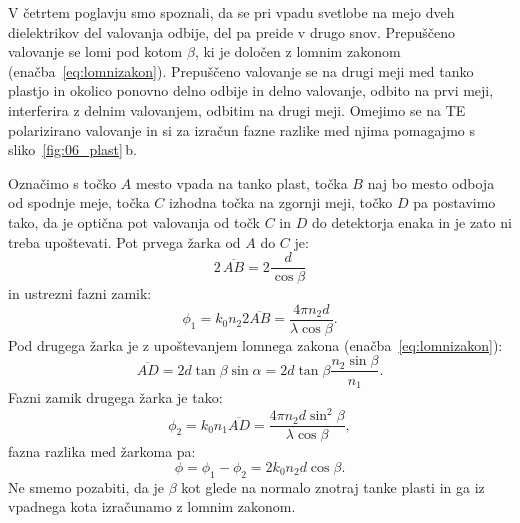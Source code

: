 V četrtem poglavju smo spoznali, da se pri vpadu svetlobe na mejo dveh dielektrikov
del valovanja odbije, del pa preide v drugo snov. Prepuščeno valovanje se lomi pod kotom
$\beta$, ki je določen z lomnim zakonom (enačba~\ref{eq:lomnizakon}). Prepuščeno valovanje
se na drugi meji med tanko plastjo in okolico ponovno delno odbije in delno valovanje, 
odbito na prvi meji, interferira z delnim valovanjem, odbitim na drugi meji. Omejimo
se na TE polarizirano valovanje in si za
izračun fazne razlike med njima pomagajmo s sliko~\ref{fig:06_plast}\,b.

Označimo s točko $A$ mesto vpada na tanko plast, točka $B$ naj bo mesto odboja 
od spodnje meje, točka $C$ izhodna točka na zgornji meji, točko $D$ pa postavimo
tako, da je optična pot valovanja od točk $C$ in $D$ do detektorja enaka in je 
zato ni treba upoštevati. Pot prvega žarka od $A$ do $C$ je:
\begin{equation}
2\,\overline{AB} = 2 \frac{d}{\cos \beta}
\label{eq:06_30}
\end{equation}
in ustrezni fazni zamik:
\begin{equation}
\phi_1 = k_0 n_2 2\overline{AB} = \frac{4\pi n_2 d}{\lambda \cos \beta}.
\label{eq:06_31}
\end{equation}
Pod drugega žarka je z upoštevanjem lomnega zakona (enačba~\ref{eq:lomnizakon}):
\begin{equation}
\overline{AD} = 2 d \tan \beta \sin \alpha = 2 d \tan \beta \frac{n_2 \sin \beta}{n_1}.
\label{eq:06_32}
\end{equation}
Fazni zamik drugega žarka je tako:
\begin{equation}
\phi_2 = k_0 n_1 \overline{AD} = \frac{4 \pi n_2 d \sin^2 \beta}{\lambda \cos \beta},
\label{eq:06_33}
\end{equation}
fazna razlika med žarkoma pa:
\begin{equation}
\phi  = \phi_1 - \phi_2 = 2 k_0 n_2 d \cos \beta.
\label{eq:06_34}
\end{equation}
Ne smemo pozabiti, da je $\beta$ kot glede na normalo znotraj tanke plasti in ga iz 
vpadnega kota izračunamo z lomnim zakonom. 

